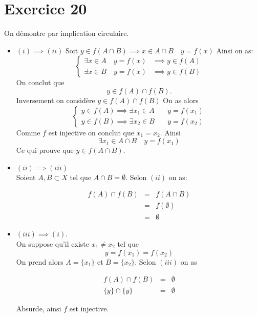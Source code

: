 \documentclass{report}
\begin{document}
\section{Exercice 20}
\begin{myproof}
On démontre par implication circulaire.
\begin{itemize}
  \item $(i) \implies (ii)$
    Soit $y\in f(A\cap B) \implies x \in A\cap B \quad y=f(x)$
    Ainsi on as:
    $$
    \begin{cases}
      \exists x\in A \quad y=f(x) &\implies y \in f(A) \\[4pt]
      \exists x\in B \quad y=f(x) &\implies y \in f(B) 
    \end{cases}
    $$
On conclut que
    $$
     y \in f(A)\cap f(B).
    $$
    Inversement on considère $y\in f(A) \cap f(B)$
    On as alors
    $$
    \begin{cases}
      y \in f(A) \implies \exists x_1 \in A &\quad y=f(x_1)   \\[4pt]

      y \in f(B) \implies \exists x_2 \in B &\quad y=f(x_2)   
    \end{cases}
    $$
    Comme $f$ est injective on conclut que $x_1 = x_2$.
    Ainsi 
    $$
    \exists x_1 \in A\cap B \quad y = f(x_1)
    $$
    Ce qui prouve que $y \in f(A\cap B)$.
  \item $(ii)\implies (iii)$\\
    Soient $A,B \subset X$ tel que $A\cap B = \emptyset$. Selon $(ii)$ on as:

    \begin{eqnarray}
      f(A) \cap f(B) &=& f(A\cap B)\\ 
                     &=& f(\emptyset)\\
                     &=& \emptyset
    \end{eqnarray}

  \item $(iii) \implies (i)$.\\

On suppose qu'il existe $x_1 \not= x_2$ tel que 
$$
y = f(x_1) = f(x_2)
$$
On prend alors $A= \{x_1\}$ et $B = \{x_2\}$.  Selon $(iii)$ on as 

\begin{eqnarray}
  f(A) \cap f(B) &=& \emptyset \\
  \{y\} \cap \{y\} &=& \emptyset
\end{eqnarray}

Absurde, ainsi $f$ est injective.

\end{itemize}
\end{myproof}
\end{document}
